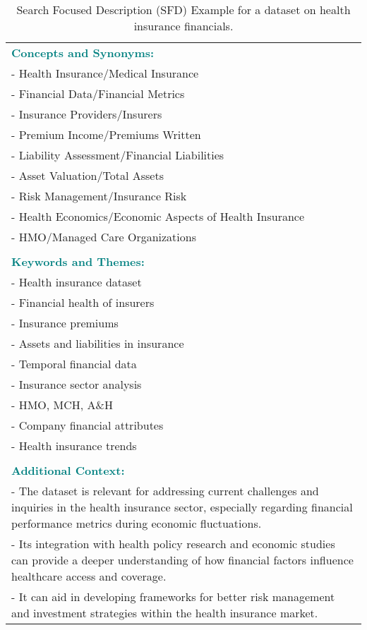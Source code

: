 \begin{table*}
\begin{tabular}{p{14cm}}
    \\
    \textcolor{teal}{\textbf{Concepts and Synonyms:}} \\
    - Health Insurance/Medical Insurance \\
    - Financial Data/Financial Metrics \\
    - Insurance Providers/Insurers \\
    - Premium Income/Premiums Written \\
    - Liability Assessment/Financial Liabilities \\
    - Asset Valuation/Total Assets \\
    - Risk Management/Insurance Risk \\
    - Health Economics/Economic Aspects of Health Insurance \\
    - HMO/Managed Care Organizations \\
    \\
    \textcolor{teal}{\textbf{Keywords and Themes:}} \\
    - Health insurance dataset \\
    - Financial health of insurers \\
    - Insurance premiums \\
    - Assets and liabilities in insurance \\
    - Temporal financial data \\
    - Insurance sector analysis \\
    - HMO, MCH, A\&H \\
    - Company financial attributes \\
    - Health insurance trends \\
    \\
    \textcolor{teal}{\textbf{Additional Context:}} \\
    - The dataset is relevant for addressing current challenges and inquiries in the health insurance sector, especially regarding financial performance metrics during economic fluctuations. \\
    - Its integration with health policy research and economic studies can provide a deeper understanding of how financial factors influence healthcare access and coverage. \\
    - It can aid in developing frameworks for better risk management and investment strategies within the health insurance market. \\
    \bottomrule
    \end{tabular}
    \caption{Search Focused Description (SFD) Example for a dataset on health insurance financials.}
    \label{tab:example_sfd}
\end{table*}
